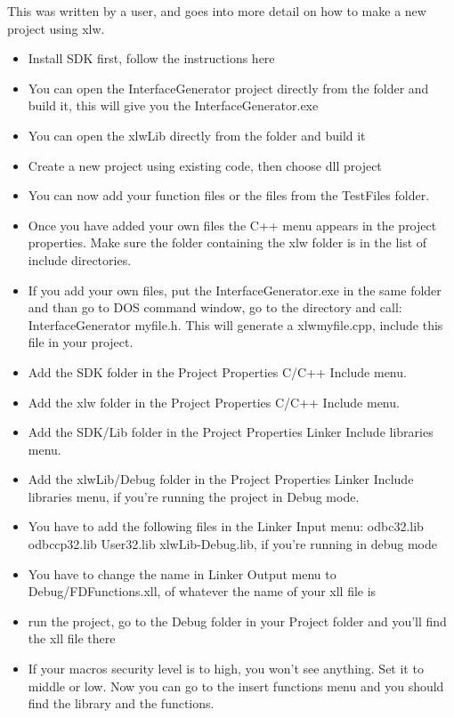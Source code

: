\documentclass[12pt,reqno]{amsart}
\numberwithin{equation}{section}
\numberwithin{figure}{section}
\begin{document}
This was written by a user, and goes into more detail on how to  make
a new project using xlw. 
\begin{itemize}
\item  Install SDK first, follow the instructions here
\item You can open the InterfaceGenerator project directly from the folder and build it, this will give you the InterfaceGenerator.exe
\item You can open the xlwLib directly from the folder and build it
\item Create a new project using existing code, then choose dll project
\item You can now add your function files or the files from the
  TestFiles folder.
\item Once you have added your own files the C++ menu appears in
  the project properties. Make sure the folder containing the xlw
  folder is in the list of include directories.
\item If you add your own files, put the InterfaceGenerator.exe in the same folder and than go to DOS command window, go to the directory and call: InterfaceGenerator myfile.h. This will generate a xlwmyfile.cpp, include this file in your project.
\item Add the SDK folder in the Project Properties C/C++ Include menu.
\item Add the xlw folder in the Project Properties C/C++ Include menu.
\item Add the SDK/Lib folder in the Project Properties Linker Include libraries menu.
\item Add the xlwLib/Debug folder in the Project Properties Linker Include libraries menu, if you're running the project in Debug mode.
\item You have to add the following files in the Linker Input menu: odbc32.lib odbccp32.lib User32.lib xlwLib-Debug.lib, if you're running in debug mode
\item You have to change the name in Linker Output menu to Debug/FDFunctions.xll, of whatever the name of your xll file is
\item run the project, go to the Debug folder in your Project folder and you'll find the xll file there
\item If your macros security level is to high, you won't see anything. Set it to middle or low. Now you can go to the insert functions menu and you should find the library and the functions.
\end{itemize}
\end{document}
